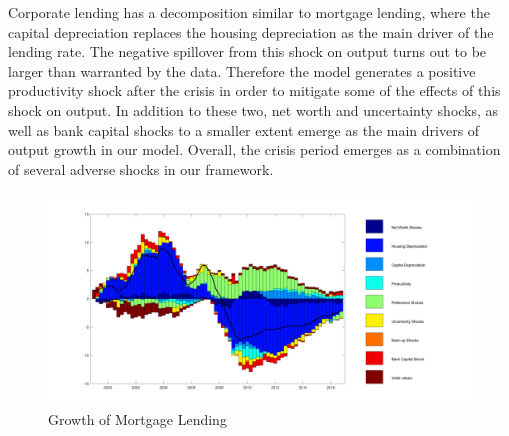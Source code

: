 \documentclass[12pt]{article}
\numberwithin{equation}{section}
\begin{document}
Corporate lending has a decomposition similar to mortgage lending, where the capital depreciation replaces the housing depreciation as the main driver of the lending rate. The negative spillover from this shock on output turns out to be larger than warranted by the data. Therefore the model generates a positive productivity shock after the crisis in order to mitigate some of the effects of this shock on output. In addition to these two, net worth and uncertainty shocks, as well as bank capital shocks to a smaller extent emerge as the main drivers of output growth in our model. Overall, the crisis period emerges as a combination of several adverse shocks in our framework. 













\begin{figure}[H]
\centering
\caption{Growth of Mortgage Lending}
\includegraphics[scale=0.45]{decomp_dbm.pdf}
\end{figure}
\end{document}
